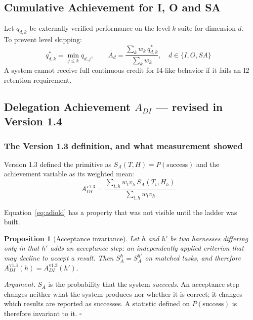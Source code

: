 \documentclass[11pt]{article}
\newtheorem{proposition}{Proposition}
\theoremstyle{definition}
\newcommand{\SA}{\ensuremath{S_A(T,H)}}
\begin{document}
\subsection{Cumulative Achievement for I, O and SA}

Let $q_{d,k}$ be externally verified performance on the level-$k$ suite for dimension $d$. To prevent level skipping:
\begin{equation}
q^{*}_{d,k} = \min_{j \le k} q_{d,j}, \qquad
A_d = \frac{\sum_k w_k\, q^{*}_{d,k}}{\sum_k w_k}, \quad d \in \{I,O,SA\}
\end{equation}
A system cannot receive full continuous credit for I4-like behavior if it fails an I2 retention requirement.

\subsection{Delegation Achievement \texorpdfstring{$A_{DI}$}{A-DI} --- revised in Version 1.4}\label{sec:adi}

\subsubsection{The Version 1.3 definition, and what measurement showed}

Version 1.3 defined the primitive as $\SA{} = P(\text{success})$ and the achievement variable as its weighted mean:
\begin{equation}
A_{DI}^{\text{v1.3}} = \frac{\sum_{t,h} w_t v_h\, S_A(T_t,H_h)}{\sum_{t,h} w_t v_h}
\label{eq:adiold}
\end{equation}

Equation~\eqref{eq:adiold} has a property that was not visible until the ladder was built.

\begin{proposition}[Acceptance invariance]\label{prop:blind}
Let $h$ and $h'$ be two harnesses differing only in that $h'$ adds an acceptance step: an independently applied criterion that may decline to accept a result. Then $S_A^{h} = S_A^{h'}$ on matched tasks, and therefore $A_{DI}^{\text{v1.3}}(h) = A_{DI}^{\text{v1.3}}(h')$.
\end{proposition}

\emph{Argument.} $S_A$ is the probability that the system \emph{succeeds}. An acceptance step changes neither what the system produces nor whether it is correct; it changes which results are reported as successes. A statistic defined on $P(\text{success})$ is therefore invariant to it. \hfill$\square$
\end{document}
